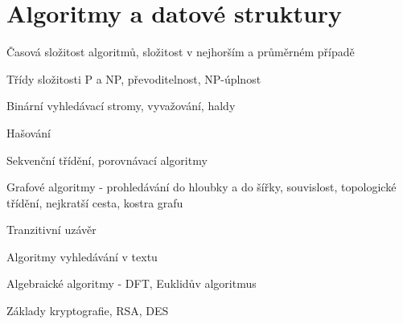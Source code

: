 \section{Algoritmy a datové struktury}
\begin{pozadavky}
\begin{pitemize}
\item Časová složitost algoritmů, složitost v nejhorším a průměrném případě
\item Třídy složitosti P a NP, převoditelnost, NP-úplnost
\item Binární vyhledávací stromy, vyvažování, haldy
\item Hašování
\item Sekvenční třídění, porovnávací algoritmy
\item Grafové algoritmy - prohledávání do hloubky a do šířky, souvislost, topologické třídění, nejkratší cesta, kostra grafu
\item Tranzitivní uzávěr
\item Algoritmy vyhledávání v textu
\item Algebraické algoritmy - DFT, Euklidův algoritmus
\item Základy kryptografie, RSA, DES
\end{pitemize}
\end{pozadavky}











